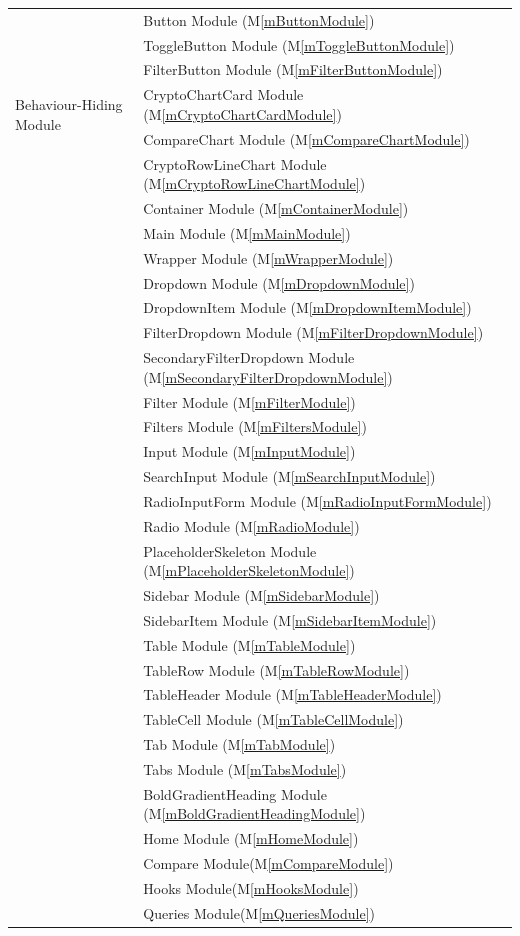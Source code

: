 \documentclass[12pt, titlepage]{article}
\newcommand{\mref}[1]{M\ref{#1}}
\begin{document}
\begin{table}[h!]
\begin{tabular}{p{} p{}}
\multirow{7}{0.3\textwidth}{Behaviour-Hiding Module} 
& Button Module (\mref{mButtonModule})\\
& ToggleButton Module (\mref{mToggleButtonModule})\\
& FilterButton Module (\mref{mFilterButtonModule})\\
& CryptoChartCard Module (\mref{mCryptoChartCardModule})\\
& CompareChart Module (\mref{mCompareChartModule})\\
& CryptoRowLineChart Module (\mref{mCryptoRowLineChartModule})\\
& Container Module (\mref{mContainerModule})\\
& Main Module (\mref{mMainModule})\\
& Wrapper Module (\mref{mWrapperModule})\\
& Dropdown Module (\mref{mDropdownModule})\\
& DropdownItem Module (\mref{mDropdownItemModule})\\
& FilterDropdown Module (\mref{mFilterDropdownModule})\\
& SecondaryFilterDropdown Module (\mref{mSecondaryFilterDropdownModule}) \\
& Filter Module (\mref{mFilterModule})\\
& Filters Module (\mref{mFiltersModule})\\
& Input Module (\mref{mInputModule})\\
& SearchInput Module (\mref{mSearchInputModule})\\
& RadioInputForm Module (\mref{mRadioInputFormModule})\\
& Radio Module (\mref{mRadioModule})\\
& PlaceholderSkeleton Module (\mref{mPlaceholderSkeletonModule})\\
& Sidebar Module (\mref{mSidebarModule})\\
& SidebarItem Module (\mref{mSidebarItemModule})\\
& Table Module (\mref{mTableModule})\\
& TableRow Module (\mref{mTableRowModule})\\
& TableHeader Module (\mref{mTableHeaderModule})\\
& TableCell Module (\mref{mTableCellModule})\\
& Tab Module (\mref{mTabModule})\\
& Tabs Module (\mref{mTabsModule})\\
& BoldGradientHeading Module (\mref{mBoldGradientHeadingModule})\\
& Home Module (\mref{mHomeModule})\\
& Compare Module(\mref{mCompareModule})\\
& Hooks Module(\mref{mHooksModule})\\
& Queries Module(\mref{mQueriesModule})\\
\midrule


\end{tabular}
\end{table}
\end{document}
